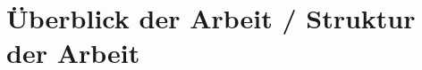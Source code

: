 \documentclass[../main.tex]{subfiles}
\begin{document}
\chapter{Überblick der Arbeit / Struktur der Arbeit}
\label{structure}
\end{document}
